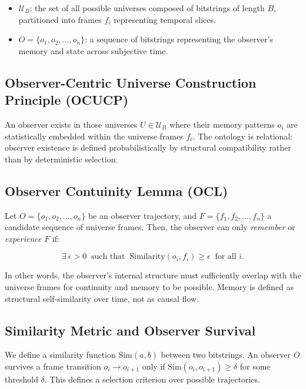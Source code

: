 \documentclass[12pt]{article}
\begin{document}
\begin{itemize}
    \item $\mathcal{U}_B$: the set of all possible universes composed of bitstrings of length $B$, partitioned into frames $f_i$ representing temporal slices.
    \item $O = \{o_1, o_2, \ldots, o_n\}$: a sequence of bitstrings representing the observer's memory and state across subjective time.
\end{itemize}

\subsection{Observer-Centric Universe Construction Principle (OCUCP)}


An observer exists in those universes $U \in \mathcal{U}_B$ where their memory patterns $o_i$ are statistically embedded within the universe frames $f_i$. The ontology is relational: observer existence is defined probabilistically by structural compatibility rather than by deterministic selection.


\subsection{Observer Contuinity Lemma (OCL)}

Let $O = \{o_1, o_2, \ldots, o_n\}$ be an observer trajectory, and $F = \{f_1, f_2, \ldots, f_n\}$ a candidate sequence of universe frames. Then, the observer can only \emph{remember} or \emph{experience} $F$ if:

\[
    \exists\ \epsilon > 0\ \text{ such that }\ \text{Similarity}(o_i, f_i) \ge \epsilon\ \text{ for all } i.
\]

In other words, the observer's internal structure must sufficiently overlap with the universe frames for continuity and memory to be possible. Memory is defined as structural self-similarity over time, not as causal flow.

\subsection{Similarity Metric and Observer Survival}

We define a similarity function $\text{Sim}(a, b)$ between two bitstrings. An observer $O$ survives a frame transition $o_i \to o_{i+1}$ only if $\text{Sim}(o_i, o_{i+1}) \ge \delta$ for some threshold $\delta$. This defines a selection criterion over possible trajectories.
\end{document}
